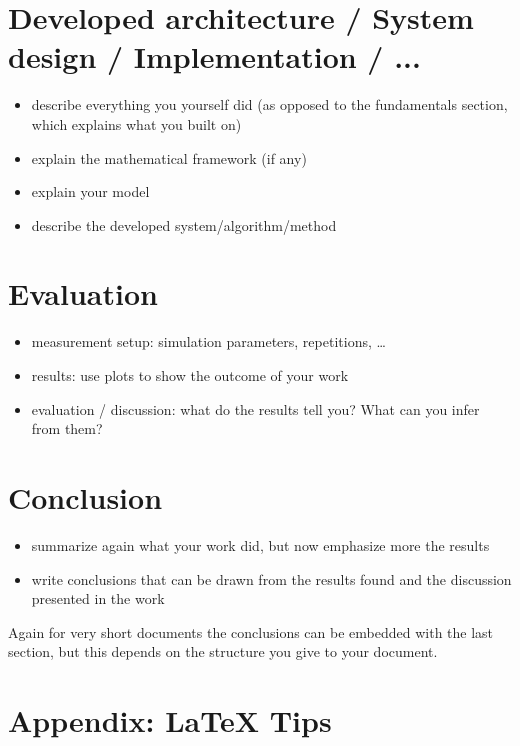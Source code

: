 \documentclass[conference]{IEEEtran}
\begin{document}
\section{Developed architecture / System design / Implementation / ...}

\begin{itemize}
\item describe everything you yourself did (as opposed to the fundamentals section, which explains what you built on)
\item explain the mathematical framework (if any)
\item explain your model
\item describe the developed system/algorithm/method
\end{itemize}

\section{Evaluation}

\begin{itemize}
\item measurement setup: simulation parameters, repetitions, \dots
\item results: use plots to show the outcome of your work
\item evaluation / discussion: what do the results tell you? What can you infer from them?
\end{itemize}

\section{Conclusion}

\begin{itemize}
\item summarize again what your work did, but now emphasize more the results
\item write conclusions that can be drawn from the results found and the discussion presented in the work
\end{itemize}

Again for very short documents the conclusions can be embedded with the last section, but this depends on the structure you give to your document. 




\section{Appendix: \LaTeX\xspace Tips}
\end{document}
